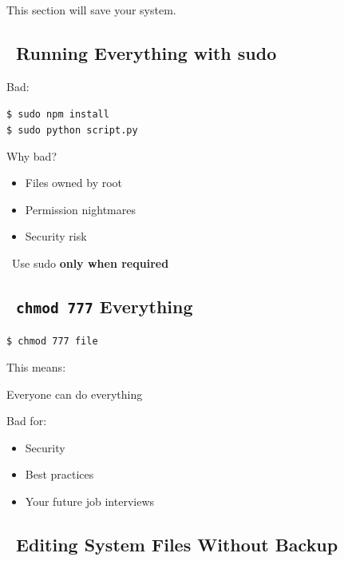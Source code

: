 \documentclass[12pt]{article}
\newcommand{\warningicon}{\faExclamationTriangle}
\newcommand{\handicon}{\faHandPointRight}
\begin{document}
This section will save your system.

\subsection*{\warningicon\ Running Everything with sudo}

Bad:

\begin{highlightbox}
\texttt{\$ sudo npm install}\\
\texttt{\$ sudo python script.py}
\end{highlightbox}

Why bad?

\begin{itemize}
    \item Files owned by root
    \item Permission nightmares
    \item Security risk
\end{itemize}

\begin{infobox}
\handicon\ Use sudo \textbf{only when required}
\end{infobox}

\subsection*{\warningicon\ \texttt{chmod 777} Everything}

\begin{highlightbox}
\texttt{\$ chmod 777 file}
\end{highlightbox}

This means:

\begin{infobox}
Everyone can do everything
\end{infobox}

Bad for:

\begin{itemize}
    \item Security
    \item Best practices
    \item Your future job interviews \faSmile
\end{itemize}

\subsection*{\warningicon\ Editing System Files Without Backup}
\end{document}
